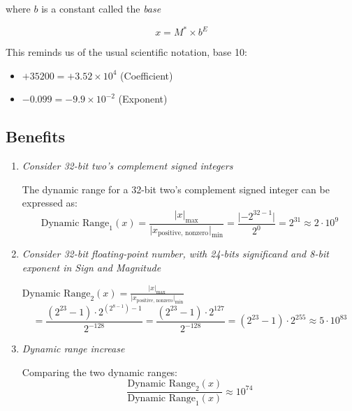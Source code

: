 \documentclass[12pt,openany]{book}
\begin{document}
			      	where \( b \) is a constant called the \textit{base}
			      	
			      	\[ x = M^* \times b^E \]
			      	
			      	This reminds us of the usual scientific notation, base 10:
			      	\begin{itemize}
			      		\item[] \( +35200 = +3.52 \times 10^4 \) (Coefficient)
			      		\item[] \( -0.099 = -9.9 \times 10^{-2} \) (Exponent)
			      	\end{itemize}
			      	
			      	\subsection{Benefits }
			      	\begin{enumerate}
			      		\item \textit{Consider 32-bit two's complement signed integers}
			      		          
			      		      The dynamic range for a 32-bit two's complement signed integer can be expressed as:
			      		      \begin{equation*}
			      		      	\text{Dynamic Range}_1 (x) = \frac{\lvert x \rvert_{\text{max}}}{\lvert x_{\text{positive, nonzero}} \rvert_{\text{min}}} = \frac{\lvert -2^{32-1} \rvert}{2^0} = 2^{31} \approx 2 \cdot 10^9
			      		      \end{equation*}
			      		          
			      		\item \textit{Consider 32-bit floating-point number, with 24-bits significand and 8-bit exponent in Sign and Magnitude}
			      		             
			      		      {$\text{Dynamic Range}_2 (x) = \frac{\lvert x \rvert_{\text{max}}}{\lvert x_{\text{positive, nonzero}} \rvert_{\text{min}}}$ $$= \frac{(2^{23} - 1) \cdot 2^{(2^{8-1}) - 1}}{2^{-128}} = \frac{(2^{23} - 1) \cdot 2^{127}}{2^{-128}} = (2^{23} - 1) \cdot 2^{255} \approx 5 \cdot 10^{83}$$}
			      		      
			      		          
			      		\item \textit{Dynamic range increase}
			      		          
			      		      Comparing the two dynamic ranges:
			      		      \begin{equation*}
			      		      	\frac{\text{Dynamic Range}_2 (x)}{\text{Dynamic Range}_1 (x)} \approx 10^{74}
			      		      \end{equation*}
			      	\end{enumerate}
			      	\newpage
			      	
\end{document}
